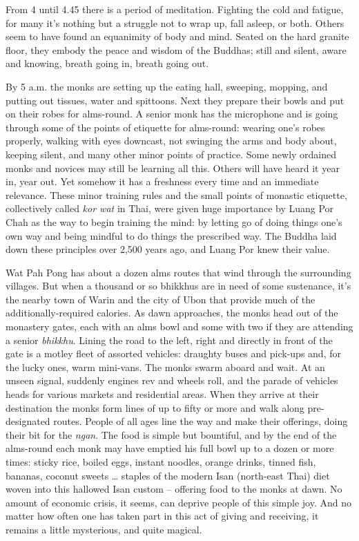 From 4 until 4.45 there is a period of meditation. Fighting the cold and
fatigue, for many it's nothing but a struggle not to wrap up, fall
asleep, or both. Others seem to have found an equanimity of body and
mind. Seated on the hard granite floor, they embody the peace and wisdom
of the Buddhas; still and silent, aware and knowing, breath going in, 
breath going out. 

By 5 a.m. the monks are setting up the eating hall, sweeping, mopping, 
and putting out tissues, water and spittoons. Next they prepare their
bowls and put on their robes for alms-round. A senior
monk has the microphone and is going through some of the points of
etiquette for alms-round: wearing one's robes properly, walking with
eyes downcast, not swinging the arms and body about, keeping silent, and
many other minor points of practice. Some newly ordained monks and
novices may still be learning all this. Others will have heard it year
in, year out. Yet somehow it has a freshness every time and an immediate
relevance. These minor training rules and the small points of monastic
etiquette, collectively called \emph{kor wat} in Thai, were given huge
importance by Luang Por Chah as the way to begin training the mind: by
letting go of doing things one's own way and being mindful to do things
the prescribed way. The Buddha laid down these principles over 2,500
years ago, and Luang Por knew their value. 

Wat Pah Pong has about a dozen alms routes that wind through the
surrounding villages. But when a thousand or so bhikkhus are in need of
some sustenance, it's the nearby town of Warin and the city of Ubon that
provide much of the additionally-required calories. As dawn approaches, 
the monks head out of the monastery gates, each with an alms bowl and
some with two if they are attending a senior \emph{bhikkhu}. Lining the
road to the left, right and directly in front of the gate is a motley
fleet of assorted vehicles: draughty buses and pick-ups and, for the
lucky ones, warm mini-vans. The monks swarm aboard and wait. At an
unseen signal, suddenly engines rev and wheels roll, and the parade of
vehicles heads for various markets and residential areas. When they
arrive at their destination the monks form lines of up to fifty or more
and walk along pre-designated routes. People of all ages line the way
and make their offerings, doing their bit for the \emph{ngan}. The food
is simple but bountiful, and by the end of the alms-round each monk may
have emptied his full bowl up to a dozen or more times: sticky rice, 
boiled eggs, instant noodles, orange drinks, tinned fish, bananas, 
coconut sweets \ldots{} staples of the modern Isan (north-east Thai)
diet woven into this hallowed Isan custom -- offering food to the monks
at dawn. No amount of economic crisis, it seems, can deprive people of
this simple joy. And no matter how often one has taken part in this act
of giving and receiving, it remains a little mysterious, and quite
magical. 

